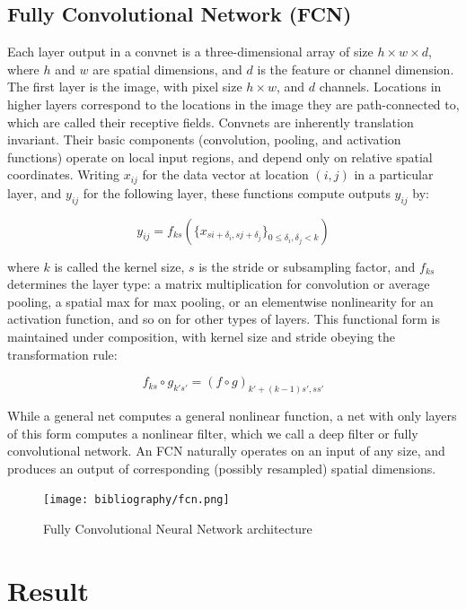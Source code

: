 \documentclass{ieeeojies}
\begin{document}
\subsection{Fully Convolutional Network (FCN)}
Each layer output in a convnet is a three-dimensional array
of size $h \times w \times d$, where $h$ and $w$ are spatial dimensions, and
$d$ is the feature or channel dimension. The first layer is the
image, with pixel size $h \times w$, and $d$ channels. Locations in
higher layers correspond to the locations in the image they
are path-connected to, which are called their receptive fields.
Convnets are inherently translation invariant. Their basic components (convolution, pooling, and activation functions) operate on local input regions, and depend only on
relative spatial coordinates. Writing $x_{ij}$ for the data vector at
location $(i, j)$ in a particular layer, and $y_{ij}$ for the following
layer, these functions compute outputs $y_{ij}$ by:

\[
y_{ij} = f_{ks} \left( \{x_{si+\delta_i, sj+\delta_j}\}_{0 \le \delta_i, \delta_j < k} \right)
\]

where $k$ is called the kernel size, $s$ is the stride or subsampling factor, and $f_{ks}$ determines the layer type: a matrix
multiplication for convolution or average pooling, a spatial
max for max pooling, or an elementwise nonlinearity for an
activation function, and so on for other types of layers.
This functional form is maintained under composition,
with kernel size and stride obeying the transformation rule:

\[
f_{ks} \circ g_{k's'} = (f \circ g)_{k' + (k-1)s', ss'}
\]

While a general net computes a general nonlinear function,
a net with only layers of this form computes a nonlinear
filter, which we call a deep filter or fully convolutional network.
An FCN naturally operates on an input of any size, and
produces an output of corresponding (possibly resampled)
spatial dimensions.\cite{Ismail}

\begin{figure}[H]
    \centering
\begin{minipage}{0.5\textwidth}
        \centering
        \texttt{[image: bibliography/fcn.png]}
        \caption{Fully Convolutional Neural Network architecture}
        \label{fig:3}
\end{minipage}
\end{figure}

\section{Result}
\end{document}
